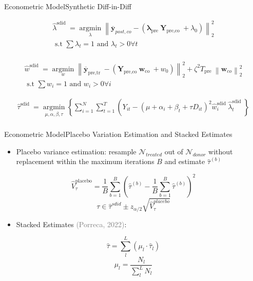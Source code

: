 \documentclass{beamer}
\theoremstyle{definition}
\begin{document}
\begin{frame}{Econometric Model}{Synthetic Diff-in-Diff}
    

$$
\begin{gathered}
    \hat{\lambda}^{\text {sdid }}=\underset{\lambda}{\operatorname{argmin}}\left\|\overline{\boldsymbol{y}}_{p o s t, c o}-\left(\boldsymbol{\lambda}_{\text {pre }} \boldsymbol{Y}_{\text {pre,co }}+\lambda_0\right)\right\|_2^2 \\
\text { s.t } \sum \lambda_t=1 \text { and } \lambda_t>0 \forall  t \\
\end{gathered}
$$

$$
\begin{gathered}
\hat{w}^{\text {sdid }}=\underset{w}{\operatorname{argmin}}\left\|\overline{\boldsymbol{y}}_{\text {pre,tr }}-\left(\boldsymbol{Y}_{\text {pre,co }} \boldsymbol{w}_{\text {co }}+w_0\right)\right\|_2^2+\zeta^2 T_{\text {pre }}\left\|\boldsymbol{w}_{c o}\right\|_2^2 
\\
\text { s.t } \sum w_i=1 \text { and } w_i>0 \forall i
\end{gathered}
$$

$$
\begin{gathered}
\hat{\tau}^{\text {sdid }}=\underset{\mu, \alpha, \beta, \tau}{\operatorname{argmin}}\left\{\sum_{i=1}^N \sum_{t=1}^T\left(Y_{i t}-\left(\mu+\alpha_i+\beta_t+\tau D_{i t}\right)^2 \hat{w}_i^{\text {sdid }} \hat{\lambda}_t^{\text {sdid }}\right\}\right. \\
\end{gathered}
$$

\end{frame}


\begin{frame}{Econometric Model}{Placebo Variation Estimation and Stacked Estimates}

\begin{itemize}
    \item Placebo variance estimation: resample $\mathcal{N}_{treated}$ out of $\mathcal{N}_{donor}$ without replacement within the maximum iterations $B$ and estimate $\hat{\tau}^{(b)}$
\end{itemize}
    $$\hat{V}^{\text{placebo}}_{\tau} = \frac{1}{B} \sum_{b=1}^{B} \left( \hat{\tau}^{(b)} - \frac{1}{B} \sum_{b=1}^{B} \hat{\tau}^{(b)} \right)^2$$
    $$\tau \in \hat{\tau}^{sdid} \pm z_{\alpha/2} \sqrt{\hat{V}^{placebo}_{\tau}}$$

\begin{itemize}
    \item Stacked Estimates \textcolor{gray}{(Porreca, 2022)}: 
\end{itemize}

$$\hat{\tau} = \sum^L_l (\mu_l \cdot \hat{\tau}_l)$$  $$\mu_l = \frac{N_l}{\sum^L_l N_l}$$
    
\end{frame}
\end{document}
